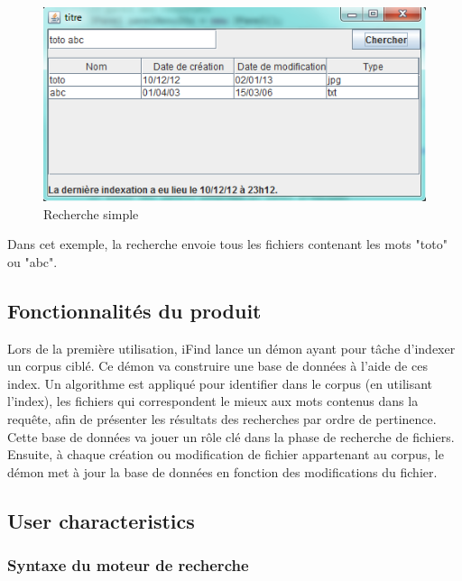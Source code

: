 \documentclass[a4paper,10pt]{article}
\begin{document}
\begin{figure}
\includegraphics[scale=0.7]{rechercheSimple.png}
\caption{Recherche simple}
\end{figure}

Dans cet exemple, la recherche envoie tous les fichiers contenant les mots
"toto" ou "abc".

\subsection{Fonctionnalités du produit}
Lors de la première utilisation, iFind lance un démon ayant pour tâche d’indexer
un corpus ciblé. 
Ce démon va construire une base de données à l’aide de ces index. Un algorithme
est appliqué pour identifier dans le corpus (en utilisant l'index), les fichiers
qui correspondent le mieux aux mots contenus dans la requête, afin de présenter
les résultats des recherches par ordre de pertinence. Cette base de données va
jouer un rôle clé dans la phase de recherche de fichiers.
Ensuite, à chaque création ou modification de fichier appartenant au corpus, le
démon met à jour la base de données en fonction des modifications du fichier.

\subsection{User characteristics}

\subsubsection{Syntaxe du moteur de recherche}
\end{document}
